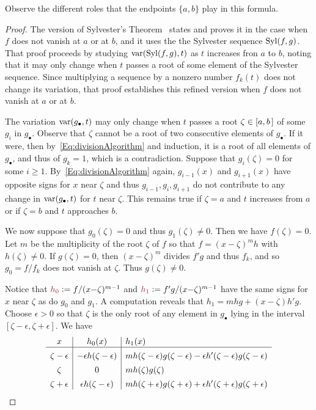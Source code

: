 Observe the different roles that the endpoints $\{a,b\}$ play in this formula.

\begin{proof}
  The version of Sylvester's Theorem~\cite[Thm.\ 2.55]{BPR} states and proves it in the case 
  when $f$ does not vanish at $a$ or at $b$, and it uses the 
  the Sylvester sequence $\operatorname{{\rm Syl}}(f,g)$.
  That proof proceeds by studying $\operatorname{{\rm var}}(\operatorname{{\rm Syl}}(f,g), t)$ as $t$ increases fron $a$ to $b$, noting that it may only
  change when $t$ passes a root of some element of the Sylvester sequence.
  Since multiplying a sequence by a nonzero number $f_k(t)$ does not change its variation, that proof establishes this refined version
  when $f$ does not vanish at $a$ or at $b$. 

  The variation $\operatorname{{\rm var}}(g_\bullet,t)$ may only change when $t$ passes a root $\zeta\in[a,b\hspace{.05cm}]$ of some $g_i$ in
  $g_\bullet$. 
  Observe that $\zeta$ cannot be a root of two consecutive elements of $g_\bullet$.
  If it were, then by~\eqref{Eq:divisionAlgorithm} and induction, it is a root of all elements of $g_\bullet$, and thus of $g_k=1$, which is a
  contradiction.
  Suppose that $g_i(\zeta)=0$ for some $i\geq 1$.
  By~\eqref{Eq:divisionAlgorithm} again, $g_{i-1}(x)$ and $g_{i+1}(x)$ have opposite signs for $x$ near $\zeta$ and thus
  $g_{i-1},g_i,g_{i+1}$ do not contribute to any change in $\operatorname{{\rm var}}(g_\bullet,t)$ for $t$ near $\zeta$.
  This remains true if $\zeta=a$ and $t$ increases from $a$ or if $\zeta=b$ and $t$ approaches $b$.

  We now suppose that $g_0(\zeta)=0$ and thus $g_1(\zeta)\neq 0$.
  Then we have $f(\zeta)=0$.
  Let $m$ be the multiplicity of the root $\zeta$ of $f$ so that $f=(x{-}\zeta)^m h$ with $h(\zeta)\neq 0$.
  If $g(\zeta)=0$, then $(x{-}\zeta)^m$ divides $f'g$ and thus $f_k$, and so $g_0=f/f_k$ does not vanish at $\zeta$.
  Thus $g(\zeta)\neq 0$.

  Notice that $\defcolor{h_0}\vcentcolon=f/(x{-}\zeta)^{m-1}$ and $\defcolor{h_1}\vcentcolon=f'g/(x{-}\zeta)^{m-1}$ have the same signs for
  $x$ near $\zeta$ as do $g_0$ and $g_1$.
  A computation reveals that $h_1=mhg+(x{-}\zeta)h'g$.
 Choose $\epsilon>0$ so that $\zeta$ is the only root of any element in $g_\bullet$ lying in the interval
 $[\zeta-\epsilon,\zeta+\epsilon]$.
 We have
 \[
 \begin{array}{c|c|l}
   x & h_0(x) & h_1(x)\\\hline
   \zeta-\epsilon & -\epsilon h(\zeta-\epsilon)  &
        mh(\zeta-\epsilon)g(\zeta-\epsilon) - \epsilon h'(\zeta-\epsilon)g(\zeta-\epsilon)  \rule{0pt}{13pt}\\
   \zeta     &     0    &   mh(\zeta)g(\zeta)  \rule{0pt}{13pt}\\
   \zeta+\epsilon & \epsilon h(\zeta-\epsilon)  &
        mh(\zeta+\epsilon)g(\zeta+\epsilon) + \epsilon h'(\zeta+\epsilon)g(\zeta+\epsilon)  \rule{0pt}{13pt}
 \end{array}
 \]
 

\end{proof}

